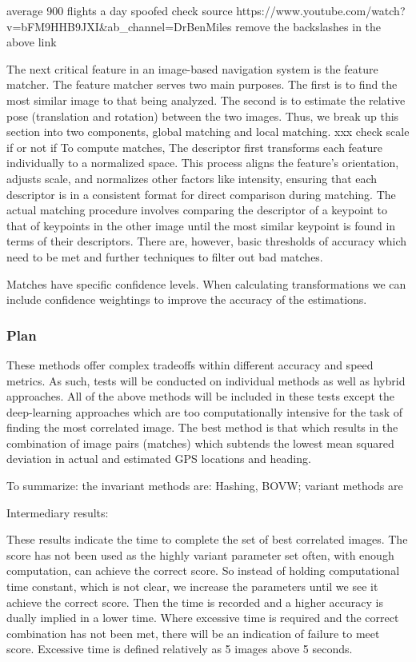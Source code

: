 average 900 flights a day spoofed check source
https://www.youtube.com/watch?v=bFM9HHB9JXI\&ab\_channel=DrBenMiles
remove the backslashes in the above link





The next critical feature in an image-based navigation system is the feature matcher. The feature matcher serves two main purposes. The first is to find the most similar image to that being analyzed. The second is to estimate the relative pose (translation and rotation) between the two images. Thus, we break up this section into two components, global matching and local matching. 
xxx check scale if or not if
To compute matches, The descriptor first transforms each feature individually to a normalized space. This process aligns the feature’s orientation, adjusts scale, and normalizes other factors like intensity, ensuring that each descriptor is in a consistent format for direct comparison during matching. The actual matching procedure involves comparing the descriptor of a keypoint to that of keypoints in the other image until the most similar keypoint is found in terms of their descriptors. There are, however, basic thresholds of accuracy which need to be met and further techniques to filter out bad matches. 


Matches have specific confidence levels. When calculating transformations we can include confidence weightings to improve the accuracy of the estimations. 


\subsubsection*{Plan}
These methods offer complex tradeoffs within different accuracy and speed metrics. As such, tests will be conducted on individual methods as well as hybrid approaches. All of the above methods will be included in these tests except the deep-learning approaches which are too computationally intensive for the task of finding the most correlated image. The best method is that which results in the combination of image pairs (matches) which subtends the lowest mean squared deviation in actual and estimated GPS locations and heading. 


To summarize: the invariant methods are: Hashing, BOVW; variant methods are 



Intermediary results:

These results indicate the time to complete the set of best correlated images. The score has not been used as the highly variant parameter set often, with enough computation, can achieve the correct score. So instead of holding computational time constant, which is not clear, we increase the parameters until we see it achieve the correct score. Then the time is recorded and a higher accuracy is dually implied in a lower time. Where excessive time is required and the correct combination has not been met, there will be an indication of failure to meet score. 
Excessive time is defined relatively as 5 images above 5 seconds. 


